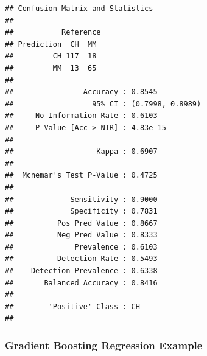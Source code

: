 \documentclass[
]{book}
\newenvironment{Shaded}{\begin{snugshade}}{\end{snugshade}}
\newcommand{\CommentTok}[1]{\textcolor[rgb]{0.56,0.35,0.01}{\textit{#1}}}
\newcommand{\DataTypeTok}[1]{\textcolor[rgb]{0.13,0.29,0.53}{#1}}
\newcommand{\DecValTok}[1]{\textcolor[rgb]{0.00,0.00,0.81}{#1}}
\newcommand{\KeywordTok}[1]{\textcolor[rgb]{0.13,0.29,0.53}{\textbf{#1}}}
\newcommand{\NormalTok}[1]{#1}
\newcommand{\OperatorTok}[1]{\textcolor[rgb]{0.81,0.36,0.00}{\textbf{#1}}}
\newcommand{\StringTok}[1]{\textcolor[rgb]{0.31,0.60,0.02}{#1}}
\begin{document}
\begin{Shaded}
\end{Shaded}

\begin{verbatim}
## Confusion Matrix and Statistics
## 
##           Reference
## Prediction  CH  MM
##         CH 117  18
##         MM  13  65
##                                           
##                Accuracy : 0.8545          
##                  95% CI : (0.7998, 0.8989)
##     No Information Rate : 0.6103          
##     P-Value [Acc > NIR] : 4.83e-15        
##                                           
##                   Kappa : 0.6907          
##                                           
##  Mcnemar's Test P-Value : 0.4725          
##                                           
##             Sensitivity : 0.9000          
##             Specificity : 0.7831          
##          Pos Pred Value : 0.8667          
##          Neg Pred Value : 0.8333          
##              Prevalence : 0.6103          
##          Detection Rate : 0.5493          
##    Detection Prevalence : 0.6338          
##       Balanced Accuracy : 0.8416          
##                                           
##        'Positive' Class : CH              
## 
\end{verbatim}

\begin{Shaded}
\end{Shaded}

\hypertarget{gradient-boosting-regression-example}{%
\subsubsection{Gradient Boosting Regression Example}\label{gradient-boosting-regression-example}}
\end{document}
